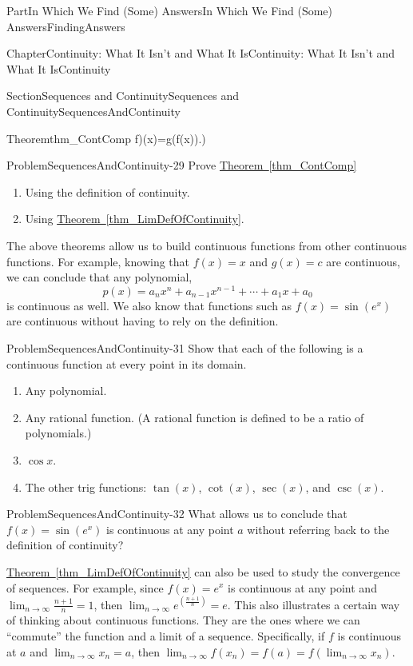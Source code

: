 \documentclass[oneside,10pt,]{book}
\newcommand{\xreffont}{\relax}
\numberwithin{equation}{part}
\begin{document}
\begin{partptx}{Part}{In Which We Find (Some) Answers}{}{In Which We Find (Some) Answers}{}{}{FindingAnswers}
\begin{chapterptx}{Chapter}{Continuity: What It Isn't and What It Is}{}{Continuity: What It Isn't and What It Is}{}{}{Continuity}
\begin{sectionptx}{Section}{Sequences and Continuity}{}{Sequences and Continuity}{}{}{SequencesAndContinuity}
\begin{theorem}{Theorem}{}{}{thm_ContComp}
f)(x)=g(f(x))\).)%
\end{theorem}
\begin{problem}{Problem}{}{SequencesAndContinuity-29}%
Prove \hyperref[thm_ContComp]{Theorem~{\xreffont\ref{thm_ContComp}}}%
\begin{enumerate}[font=\bfseries,label=(\alph*),ref=\alph*]%
\item{}Using the definition of continuity.%
\item{}Using \hyperref[thm_LimDefOfContinuity]{Theorem~{\xreffont\ref{thm_LimDefOfContinuity}}}.%
\end{enumerate}%
\end{problem}
The above theorems allow us to build continuous functions from other continuous functions.  For example, knowing that \(f(x)=x\) and \(g(x)=c\) are continuous, we can conclude that any polynomial,%
\begin{equation*}
p(x)=a_nx^n+a_{n-1}x^{n-1}+\cdots+a_1x+a_0
\end{equation*}
is continuous as well.  We also know that functions such as \(f(x)=\sin\left(e^x\right)\) are continuous without having to rely on the definition.%
\begin{problem}{Problem}{}{SequencesAndContinuity-31}%
Show that each of the following is a continuous function at every point in its domain.%
\begin{enumerate}[font=\bfseries,label=(\alph*),ref=\alph*]%
\item{}Any polynomial.%
\item{}Any rational function. (A rational function is defined to be a ratio of polynomials.)%
\item{}\(\cos x\).%
\item{}The other trig functions: \(\tan(x)\), \(\cot(x)\), \(\sec(x)\), and \(\csc(x)\).%
\end{enumerate}%
\end{problem}
\begin{problem}{Problem}{}{SequencesAndContinuity-32}%
What allows us to conclude that \(f(x)=\sin\left(e^x\right)\) is continuous at any point \(a\) without referring back to the definition of continuity?%
\end{problem}
\hyperref[thm_LimDefOfContinuity]{Theorem~{\xreffont\ref{thm_LimDefOfContinuity}}} can also be used to study the convergence of sequences.  For example, since \(f(x)=e^x\) is continuous at any point and \(\lim_{n\rightarrow\infty}\frac{n+1}{n}=1\), then \(\lim_{n\rightarrow\infty}e^{\left(\frac{n+1}{n}\right)}=e\). This also illustrates a certain way of thinking about continuous functions.  They are the ones where we can ``commute'' the function and a limit of a sequence.  Specifically, if \(f\) is continuous at \(a\) and \(\lim_{n\rightarrow\infty}x_n=a\), then \(\lim_{n\rightarrow\infty}f(x_n)=f(a)=f\left(\lim_{n\rightarrow\infty}x_n\right)\).%

\end{sectionptx}
\end{chapterptx}
\end{partptx}
\end{document}
